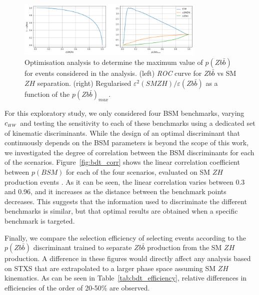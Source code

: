 \begin{figure}
\centering
\includegraphics[width=0.8\textwidth]{plots/bkg_cut_opt.png}
\caption{
\label{fig:s2_over_b}
Optimisation analysis to determine the maximum value of $p(Z b\bar{b})$ for events
considered in the analysis. (left) {\it ROC} curve for $Z b\bar{b}$ vs SM $Z H$
separation. (right) Regularised $\varepsilon^2(SM Z H) /
\varepsilon(Zb\bar{b})$ as a function of the $p(Z b\bar{b})_{max}$.
}
\end{figure}

For this exploratory study, we only considered four BSM benchmarks, varying $c_{\scriptscriptstyle HW}$ and testing the
sensitivity to each of these benchmarks using a dedicated set of kinematic
discriminants. While the design of an optimal discriminant that continuously depends on
the BSM parameters is beyond the scope of this work, we investigated the degree of
correlation between the BSM discriminants for each of the scenarios.
Figure~\ref{fig:bdt_corr} shows the linear correlation coefficient between $p(BSM)$ for
each of the four scenarios, evaluated on SM $Z H$ production events . As it can be seen,
the linear correlation varies between 0.3 and 0.96, and it increases as the distance
between the benchmark points decreases. This suggests that the information used to
discriminate the different benchmarks is similar, but that optimal results are obtained
when a specific benchmark is targeted.

Finally, we compare the selection efficiency of selecting events according to the $p(Z
b\bar{b})$ discriminant trained to separate $Z b\bar{b}$ production from the SM $Z H$
production. A difference in these figures would directly affect any analysis based on STXS that are extrapolated to a larger phase space assuming SM $Z
H$ kinematics. As can be seen in Table~\ref{tab:bdt_efficiency}, relative differences in efficiencies of the order of 20-50\% are observed. 
%

